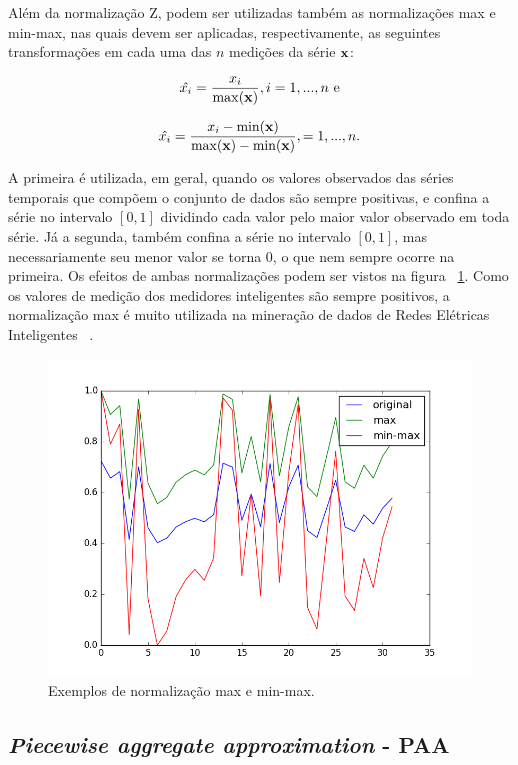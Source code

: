Além da normalização Z, podem ser utilizadas também as normalizações max e min-max, nas quais devem ser aplicadas, respectivamente, as seguintes transformações em cada uma das $n$ medições da série $\bf{x}$:

\begin{equation}
\hat{x_i} = \frac{x_i}{\max(\bf{x})}, i = 1,...,n \text{          e}
\end{equation}

\begin{equation}
\hat{x_i} = \frac{x_i-\min(\bf{x})}{\max(\bf{x}) - \min(\bf{x})},  = 1,...,n.
\end{equation}

A primeira é utilizada, em geral, quando os valores observados das séries temporais que compõem o conjunto de dados são sempre positivas, e confina a série no intervalo $[0,1]$ dividindo cada valor pelo maior valor observado em toda série. Já a segunda, também confina a série no intervalo $[0,1]$, mas necessariamente seu menor valor se torna $0$, o que nem sempre ocorre na primeira. Os efeitos de ambas normalizações podem ser vistos na figura ~\ref{fig:norms}. Como os valores de medição dos medidores inteligentes são sempre positivos, a normalização max é muito utilizada na mineração de dados de Redes Elétricas Inteligentes ~\parencite{Chicco}.
\textbf{}
\begin{figure}[h!]
	\includegraphics[width=\linewidth]{figuras/normalizations.png}
	\caption{Exemplos de normalização max e min-max.}
	\label{fig:norms}
\end{figure}

\subsection{\emph{Piecewise aggregate approximation} - 
	PAA}

